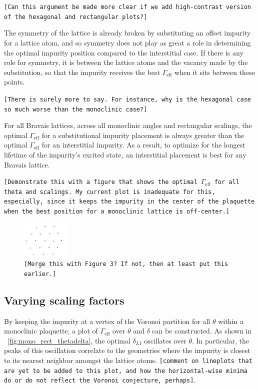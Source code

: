 \documentclass[aps,pra,superscriptaddress,twocolumn]{revtex4-1}
\newcommand{\fref}[1]{\text{Fig.}~\ref{#1}}
\newcommand{\commentSB}[1]{\texttt{\color{blue}[#1]}}
\begin{document}
\commentSB{Can this argument be made more clear if we add high-contrast version of the hexagonal and rectangular plots?}

The symmetry of the lattice is already broken by substituting an offset impurity for a lattice atom, and so symmetry does not play as great a role in determining the optimal impurity position compared to the interstitial case. If there is any role for symmetry, it is between the lattice atoms and the vacancy made by the substitution, so that the impurity receives the best $\Gamma_\text{eff}$ when it sits between these points. 

\commentSB{There is surely more to say. For instance, why is the hexagonal case so much worse than the monoclinic case?}

For all Bravais lattices, across all monoclinic angles and rectangular scalings, the optimal $\Gamma_\text{eff}$ for a substitutional impurity placement is always greater than the optimal $\Gamma_\text{eff}$ for an interstitial impurity. As a result, to optimize for the longest lifetime of the impurity's excited state, an interstitial placement is best for any Bravais lattice. 

\commentSB{Demonstrate this with a figure that shows the optimal $\Gamma_\text{eff}$ for all theta and scalings. My current plot is inadequate for this, especially, since it keeps the impurity in the center of the plaquette when the best position for a monoclinic lattice is off-center.} 

\begin{figure}
    \centering
    \includegraphics[width=0.2\textwidth]{figures/triangle_substitution_geometry.png}
    \caption{\commentSB{Merge this with Figure 3? If not, then at least put this earlier.}}
    \label{fig:triangle_substitution_geometry}
\end{figure}

\subsection{Varying scaling factors}

By keeping the impurity at a vertex of the Voronoi partition for all $\theta$ within a monoclinic plaquette, a plot of $\Gamma_\text{eff}$ over $\theta$ and $\delta$ can be constructed. As shown in \fref{fig:mono_rect_thetadelta}, the optimal $\delta_{LI}$ oscillates over $\theta$. In particular, the peaks of this oscillation correlate to the geometries where the impurity is closest to its nearest neighbor amongst the lattice atoms. \commentSB{comment on lineplots that are yet to be added to this plot, and how the horizontal-wise minima do or do not reflect the Voronoi conjecture, perhaps}. 
\end{document}
